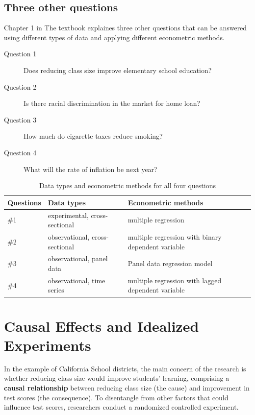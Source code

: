 \documentclass[a4paper,11pt]{article}
\begin{document}
\subsection*{Three other questions}
\label{sec:org9c40033}

Chapter 1 in The textbook explaines three other questions that can be
answered using different types of data and applying different
econometric methods.

\begin{description}
\item[{Question 1}] Does reducing class size improve elementary school education?
\item[{Question 2}] Is there racial discrimination in the market for home loan?
\item[{Question 3}] How much do cigarette taxes reduce smoking?
\item[{Question 4}] What will the rate of inflation be next year?
\end{description}

\begin{table}[htbp]
\caption{\label{tab:orga6aeec4}
Data types and econometric methods for all four questions}
\centering
\begin{tabular}{lll}
Questions & Data types & Econometric methods\\
\hline
\#1 & experimental, cross-sectional & multiple regression\\
\#2 & observational, cross-sectional & multiple regression with binary dependent variable\\
\#3 & observational, panel data & Panel data regression model\\
\#4 & observational, time series & multiple regression with lagged dependent variable\\
\end{tabular}
\end{table}


\section{Causal Effects and Idealized Experiments}
\label{sec:orgcb63cd1}

In the example of California School districts, the main concern of the
research is whether reducing class size would improve students'
learning, comprising a \textbf{causal relationship} between reducing class
size (the cause) and improvement in test scores (the consequence). To
disentangle from other factors that could influence test scores,
researchers conduct a randomized controlled experiment. 
\end{document}
